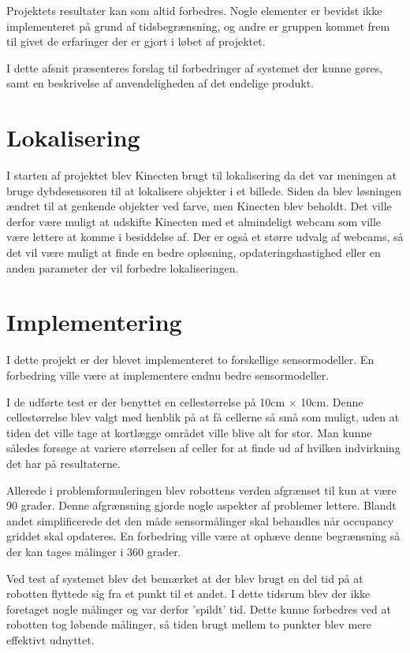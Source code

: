 Projektets resultater kan som altid forbedres.
Nogle elementer er bevidst ikke implementeret på grund af tidsbegrænsning, og andre er gruppen kommet frem til givet de erfaringer der er gjort i løbet af projektet.

I dette afsnit præsenteres forslag til forbedringer af systemet der kunne gøres, samt en beskrivelse af anvendeligheden af det endelige produkt.

\section{Lokalisering}
I starten af projektet blev Kinecten brugt til lokalisering da det var meningen at bruge dybdesensoren til at lokalisere objekter i et billede.
Siden da blev løsningen ændret til at genkende objekter ved farve, men Kinecten blev beholdt.
Det ville derfor være muligt at udskifte Kinecten med et almindeligt webcam som ville være lettere at komme i besiddelse af. 
Der er også et større udvalg af webcams, så det vil være muligt at finde en bedre opløsning, opdateringshastighed eller en anden parameter der vil forbedre lokaliseringen.

\section{Implementering}
I dette projekt er der blevet implementeret to forskellige sensormodeller. 
En forbedring ville være at implementere endnu bedre sensormodeller.

I de udførte test er der benyttet en cellestørrelse på 10cm $ \times $ 10cm.
Denne cellestørrelse blev valgt med henblik på at få cellerne så små som muligt, uden at tiden det ville tage at kortlægge området ville blive alt for stor.
Man kunne således forsøge at variere størrelsen af celler for at finde ud af hvilken indvirkning det har på resultaterne.

Allerede i problemformuleringen blev robottens verden afgrænset til kun at være 90 grader. 
Denne afgrænsning gjorde nogle aspekter af problemer lettere. 
Blandt andet simplificerede det den måde sensormålinger skal behandles når occupancy griddet skal opdateres.
En forbedring ville være at ophæve denne begrænsning så der kan tages målinger i 360 grader.

Ved test af systemet blev det bemærket at der blev brugt en del tid på at robotten flyttede sig fra et punkt til et andet.
I dette tidsrum blev der ikke foretaget nogle målinger og var derfor 'spildt' tid. 
Dette kunne forbedres ved at robotten tog løbende målinger, så tiden brugt mellem to punkter blev mere effektivt udnyttet.

